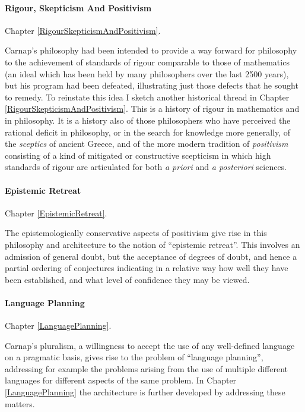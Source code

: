 \paragraph{Rigour, Skepticism And Positivism}

Chapter \ref{RigourSkepticismAndPositivism}.

Carnap's philosophy had been intended to provide a way forward for
philosophy to the achievement of standards of rigour comparable to
those of mathematics (an ideal which has been held by many
philosophers over the last 2500 years), but his program had been
defeated, illustrating  just those defects that he sought to remedy.
To reinstate this idea I sketch another historical thread in Chapter \ref{RigourSkepticismAndPositivism}.
This is a history of rigour in mathematics and in philosophy.
It is a history also of those philosophers who have perceived the
rational deficit in philosophy, or in the search for knowledge more
generally, of the \emph{sceptics} of ancient Greece, and of the more
modern tradition of \emph{positivism} consisting of a kind of
mitigated or constructive scepticism in which high standards of rigour
are articulated for both \emph{a priori} and \emph{a posteriori} sciences.

\paragraph{Epistemic Retreat}

Chapter \ref{EpistemicRetreat}.

The epistemologically conservative aspects of positivism give rise in
this philosophy and architecture to the notion of ``epistemic
retreat''.
This involves an admission of general doubt, but the acceptance of
degrees of doubt, and hence a partial ordering of conjectures
indicating in a relative way how well they have been established, and
what level of confidence they may be viewed.

\paragraph{Language Planning}

Chapter \ref{LanguagePlanning}.

Carnap's pluralism, a willingness to accept the use of any
well-defined language on a pragmatic basis, gives rise to the problem
of ``language planning'', addressing for example the problems arising
from the use of multiple different languages for different aspects of
the same problem.
In Chapter \ref{LanguagePlanning} the architecture is further
developed by addressing these matters.

